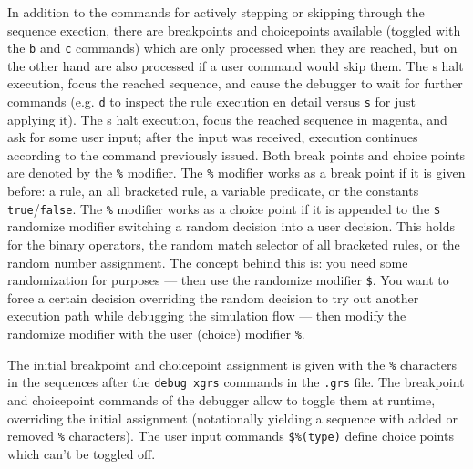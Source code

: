 In addition to the commands for actively stepping or skipping through the sequence exection,
there are breakpoints and choicepoints available (toggled with the \texttt{b} and \texttt{c} commands)
which are only processed when they are reached, but on the other hand are also processed if a user command would skip them.
The s halt execution, focus the reached sequence, and cause the debugger to wait for further commands
(e.g. \texttt{d} to inspect the rule execution en detail versus \texttt{s} for just applying it).
The s halt execution, focus the reached sequence in magenta, and ask for some user input; 
after the input was received, execution continues according to the command previously issued.
Both break points and choice points are denoted by the \texttt{\%} modifier. 
The \texttt{\%} modifier works as a break point if it is given before: a rule, an all bracketed rule, a variable predicate, or the constants \texttt{true}/\texttt{false}.
The \texttt{\%} modifier works as a choice point if it is appended to the \texttt{\$} randomize modifier switching a random decision into a user decision.
This holds for the binary operators, the random match selector of all bracketed rules, or the random number assignment.
The concept behind this is: you need some randomization for  purposes --- then use the randomize modifier \texttt{\$}.
You want to force a certain decision overriding the random decision to try out another execution path while debugging the simulation flow --- then modify the randomize modifier with the user (choice) modifier \texttt{\%}.

The initial breakpoint and choicepoint assignment is given with the \texttt{\%} characters in the sequences after the \texttt{debug xgrs} commands in the \texttt{.grs} file.
The breakpoint and choicepoint commands of the debugger allow to toggle them at runtime, overriding the initial assignment (notationally yielding a sequence with added or removed \texttt{\%} characters).
The user input commands \texttt{\$\%(type)} define choice points which can't be toggled off.

